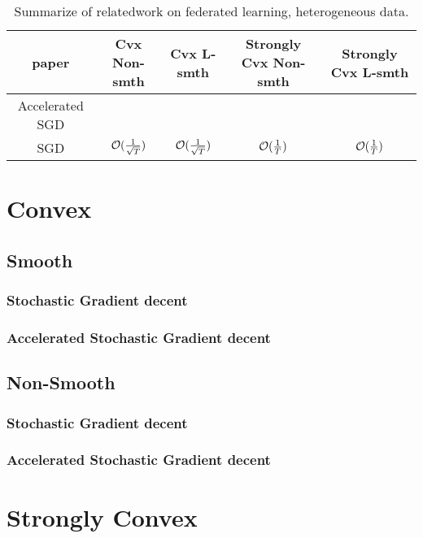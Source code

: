 

\begin{table}[h!]
\centering
\small
	\begin{tabular}{|c|c|c|c|c|}\hline
		paper         &  Cvx Non-smth & Cvx L-smth & Strongly Cvx Non-smth& Strongly Cvx L-smth \\ \hline
	Accelerated	SGD   &        &    &       &      \\\hline
	SGD    &    ${\mathcal{O}}(\frac{1}{\sqrt{T}})$  &   ${\mathcal{O}}(\frac{1}{\sqrt{T}})$  &  ${\mathcal{O}}(\frac{1}{T})$  & ${\mathcal{O}}(\frac{1}{T})$\cite{li2019convergence,haddadpour2019convergence}      \\\hline
	\end{tabular}
	\caption{Summarize of relatedwork on federated learning, heterogeneous data.}
\end{table}


\section{Convex}

\subsection{Smooth}
\subsubsection{Stochastic Gradient decent}
% 
\subsubsection{Accelerated Stochastic Gradient decent}

\subsection{Non-Smooth}
\subsubsection{Stochastic Gradient decent}


\subsubsection{Accelerated Stochastic Gradient decent}



\section{Strongly Convex}

